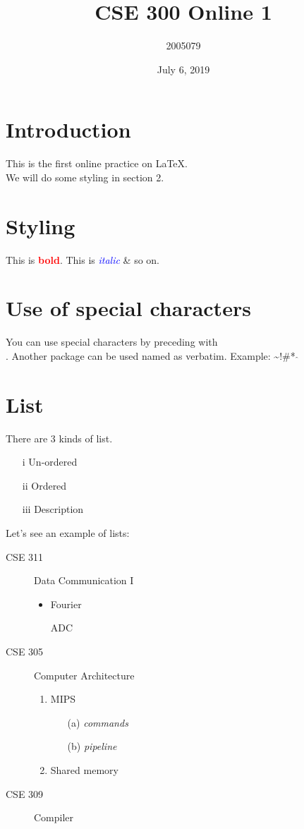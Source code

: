 \documentclass{article}
\title{CSE 300 Online 1}
\author{2005079}
\date{July 6, 2019}
\begin{document}
\maketitle
\tableofcontents

\section{Introduction}
This is the first online practice on \LaTeX.\\ 
We will do some styling in section 2.
\section{Styling}
This is \textbf{\textcolor{red}{bold}}. This is \textit{\textcolor{blue}{italic}} \& so on.
\section*{Use of special characters}
You can use special characters by preceding with \\. Another package can be used named as verbatim. Example: \textasciitilde !\textdollar \#\textbackslash@* $\hat{}$
\section{List}
There are 3 kinds of list.
\begin{enumerate}
    \item[i] Un-ordered
    \item[ii] Ordered
    \item[iii] Description 
\end{enumerate}
\newpage
Let's see an example of lists:
\begin{description}
    \item[CSE 311] Data Communication I
    \begin{itemize}
        \item Fourier 
        \item[] ADC 
    \end{itemize}
    \item[CSE 305] Computer Architecture 
    \begin{enumerate}
        \item MIPS 
        \begin{itemize}
            \item[(a)] \textit{commands}
            \item[(b)] \textit{pipeline}
        \end{itemize}
        \item Shared memory
    \end{enumerate}
    \item[CSE 309] Compiler 
\end{description}
\end{document}
